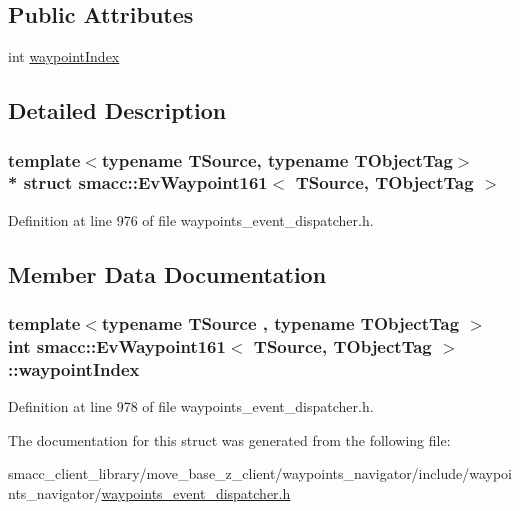 \subsection*{Public Attributes}
\begin{DoxyCompactItemize}
\item 
int \hyperlink{structsmacc_1_1EvWaypoint161_a90bbd4460f0cf6ab8e21904378b89d1c}{waypoint\+Index}
\end{DoxyCompactItemize}


\subsection{Detailed Description}
\subsubsection*{template$<$typename T\+Source, typename T\+Object\+Tag$>$\\*
struct smacc\+::\+Ev\+Waypoint161$<$ T\+Source, T\+Object\+Tag $>$}



Definition at line 976 of file waypoints\+\_\+event\+\_\+dispatcher.\+h.



\subsection{Member Data Documentation}
\subsubsection[{\texorpdfstring{waypoint\+Index}{waypointIndex}}]{\setlength{\rightskip}{0pt plus 5cm}template$<$typename T\+Source , typename T\+Object\+Tag $>$ int {\bf smacc\+::\+Ev\+Waypoint161}$<$ T\+Source, T\+Object\+Tag $>$\+::waypoint\+Index}\hypertarget{structsmacc_1_1EvWaypoint161_a90bbd4460f0cf6ab8e21904378b89d1c}{}\label{structsmacc_1_1EvWaypoint161_a90bbd4460f0cf6ab8e21904378b89d1c}


Definition at line 978 of file waypoints\+\_\+event\+\_\+dispatcher.\+h.



The documentation for this struct was generated from the following file\+:\begin{DoxyCompactItemize}
\item 
smacc\+\_\+client\+\_\+library/move\+\_\+base\+\_\+z\+\_\+client/waypoints\+\_\+navigator/include/waypoints\+\_\+navigator/\hyperlink{waypoints__event__dispatcher_8h}{waypoints\+\_\+event\+\_\+dispatcher.\+h}\end{DoxyCompactItemize}
